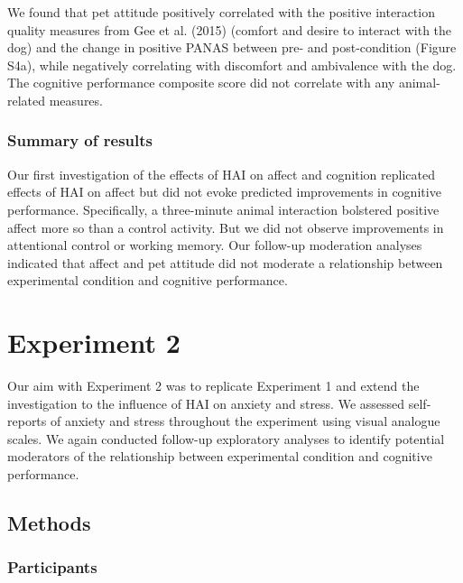 \documentclass[
  english,
  pub,floatsintext]{apa6}
\begin{document}
We found that pet attitude positively correlated with the positive interaction quality measures from Gee et al. (2015) (comfort and desire to interact with the dog) and the change in positive PANAS between pre- and post-condition (Figure S4a), while negatively correlating with discomfort and ambivalence with the dog. The cognitive performance composite score did not correlate with any animal-related measures.

\hypertarget{summary-of-results}{%
\subsubsection{Summary of results}\label{summary-of-results}}

Our first investigation of the effects of HAI on affect and cognition replicated effects of HAI on affect but did not evoke predicted improvements in cognitive performance. Specifically, a three-minute animal interaction bolstered positive affect more so than a control activity. But we did not observe improvements in attentional control or working memory. Our follow-up moderation analyses indicated that affect and pet attitude did not moderate a relationship between experimental condition and cognitive performance.

\hypertarget{experiment-2}{%
\section{Experiment 2}\label{experiment-2}}

Our aim with Experiment 2 was to replicate Experiment 1 and extend the investigation to the influence of HAI on anxiety and stress. We assessed self-reports of anxiety and stress throughout the experiment using visual analogue scales. We again conducted follow-up exploratory analyses to identify potential moderators of the relationship between experimental condition and cognitive performance.

\hypertarget{methods-1}{%
\subsection{Methods}\label{methods-1}}

\hypertarget{participants-1}{%
\subsubsection{Participants}\label{participants-1}}
\end{document}
